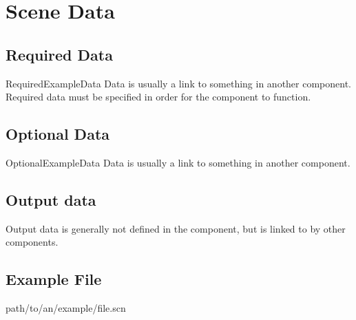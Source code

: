 \section{Scene Data}

\subsection{Required Data}

\begin{componentoption}{RequiredExampleData}
Data is usually a link to something in another component. Required data must be specified in order for the component to function.
\end{componentoption}

\subsection{Optional Data}

\begin{componentoption}{OptionalExampleData}
Data is usually a link to something in another component.
\end{componentoption}

\subsection{Output data}
Output data is generally not defined in the component, but is linked to by other components.

\subsection{Example File}
path/to/an/example/file.scn

